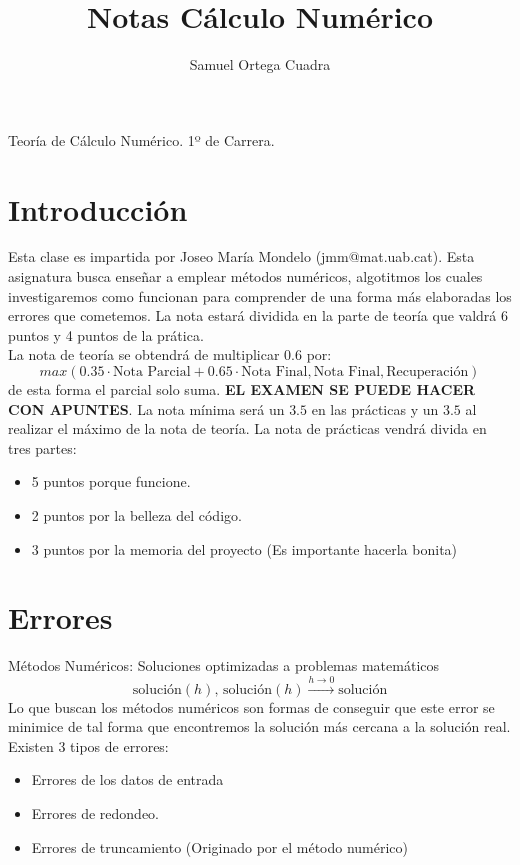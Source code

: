 \documentclass[11pt]{article}
\title{Notas Cálculo Numérico}
\author{Samuel Ortega Cuadra}
\theoremstyle{plain}
\begin{document}
    \begin{center}
        \huge{Teoría de Cálculo Numérico. 1º de Carrera.}
    \end{center}
    \tableofcontents
    \newpage
    \section{Introducción} %
    \label{sec:introducción}
        Esta clase es impartida por Joseo María Mondelo (jmm@mat.uab.cat). Esta asignatura busca enseñar a emplear métodos numéricos, algotitmos los cuales investigaremos como funcionan para comprender de una forma más elaboradas los errores que cometemos. La nota estará dividida en la parte de teoría que valdrá 6 puntos y 4 puntos de la prática.\\

        La nota de teoría se obtendrá de multiplicar $0.6$ por: \[max(0.35 \cdot \text{Nota Parcial} + 0.65 \cdot \text{Nota Final},\text{Nota Final}, \text{Recuperación})\] de esta forma el parcial solo suma. \textbf{EL EXAMEN SE PUEDE HACER CON APUNTES}. La nota mínima será un $3.5$ en las prácticas y un $3.5$ al realizar el máximo de la nota de teoría. La nota de prácticas vendrá divida en tres partes:
        \begin{itemize}
             \item 5 puntos porque funcione.
             \item 2 puntos por la belleza del código.
             \item 3 puntos por la memoria del proyecto (Es importante hacerla bonita)
         \end{itemize} 
    \section{Errores} %
    \label{sec:errores}
        Métodos Numéricos: Soluciones optimizadas a problemas matemáticos
        \begin{equation}
            \text{solución}(h)\text{, solución}(h) \xrightarrow{h \rightarrow 0} \text{solución}
        \end{equation}
        Lo que buscan los métodos numéricos son formas de conseguir que este error se minimice de tal forma que encontremos la solución más cercana a la solución real. Existen 3 tipos de errores:
        \begin{itemize}
            \item Errores de los datos de entrada
            \item Errores de redondeo.
            \item Errores de truncamiento (Originado por el método numérico)
        \end{itemize}
\end{document}
